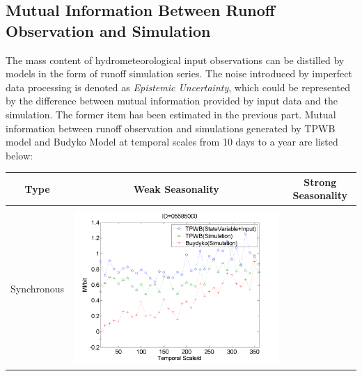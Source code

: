 \documentclass[draft,wrr]{AGUTeX}
\begin{document}
\begin{article}
\subsection{Mutual Information Between Runoff Observation and Simulation}
The mass content of hydrometeorological input observations can be distilled by models in the form of runoff simulation series. The noise introduced by imperfect data processing is denoted as \emph{Epistemic Uncertainty}, which could be represented by the difference between  mutual information provided by input data and  the simulation. The former item has been estimated in the previous part. Mutual information between runoff observation and simulations  generated by TPWB model and Budyko Model at temporal scales from 10 days to a year are listed below: 
\begin{table}[H]\small
\label{sm}
\resizebox{\textwidth}{!}
{
\centering
\begin{tabular}{ccc}
\hline
Type& Weak Seasonality & Strong Seasonality \\\hline
\\
Synchronous
&\begin{minipage}{.6\textwidth}\includegraphics[width=\linewidth]{resultgraph/05585000MI.png}\end{minipage}


\end{tabular}}
\end{table}
\end{article}
\end{document}
